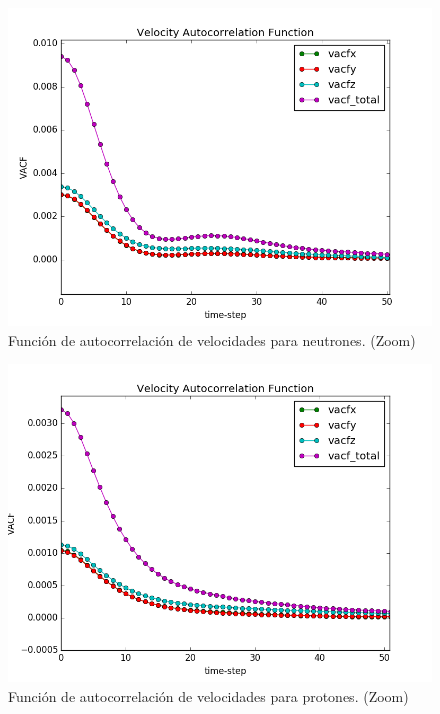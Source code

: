 \documentclass[
 reprint,
 amsmath,amssymb,
 aps,
 a4paper
]{revtex4-1}
\begin{document}
\begin{figure}
\centerline{
  \includegraphics[width=1.0\linewidth]{vacf_N_50.png}}
  \caption{\small Función de autocorrelación de velocidades para neutrones. (Zoom)}
  \label{fig:vacf_N_50}
\end{figure}

\begin{figure}
\centerline{
  \includegraphics[width=1.0\linewidth]{vacf_Z_50.png}}
  \caption{\small Función de autocorrelación de velocidades para protones. (Zoom)}
  \label{fig:vacf_Z_50}
\end{figure}
\end{document}
